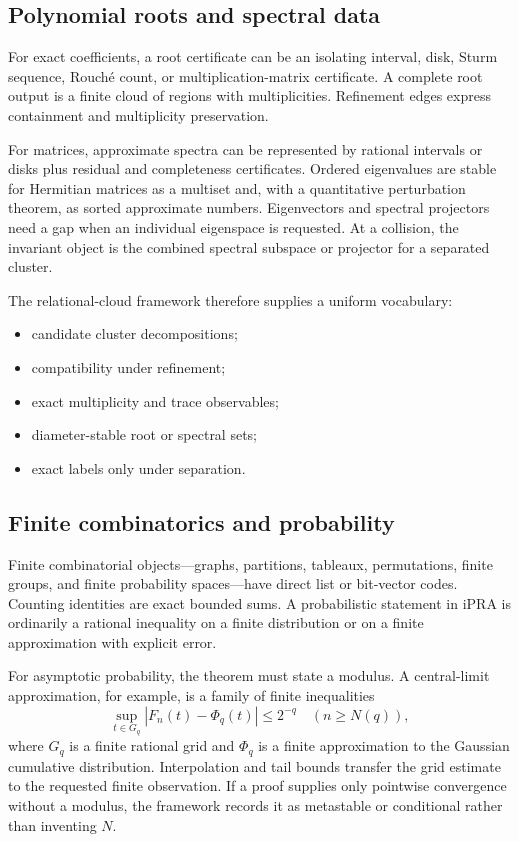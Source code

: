 \subsection{Polynomial roots and spectral data}

For exact coefficients, a root certificate can be an isolating interval, disk, Sturm sequence, Rouch\'e
count, or multiplication-matrix certificate.  A complete root output is a finite cloud of regions with
multiplicities.  Refinement edges express containment and multiplicity preservation.

For matrices, approximate spectra can be represented by rational intervals or disks plus residual and
completeness certificates.  Ordered eigenvalues are stable for Hermitian matrices as a multiset and, with a
quantitative perturbation theorem, as sorted approximate numbers.  Eigenvectors and spectral projectors
need a gap when an individual eigenspace is requested.  At a collision, the invariant object is the combined
spectral subspace or projector for a separated cluster.

The relational-cloud framework therefore supplies a uniform vocabulary:
\begin{itemize}
  \item candidate cluster decompositions;
  \item compatibility under refinement;
  \item exact multiplicity and trace observables;
  \item diameter-stable root or spectral sets;
  \item exact labels only under separation.
\end{itemize}

\subsection{Finite combinatorics and probability}

Finite combinatorial objects---graphs, partitions, tableaux, permutations, finite groups, and finite
probability spaces---have direct list or bit-vector codes.  Counting identities are exact bounded sums.
A probabilistic statement in iPRA is ordinarily a rational inequality on a finite distribution or on a
finite approximation with explicit error.

For asymptotic probability, the theorem must state a modulus.  A central-limit approximation, for example,
is a family of finite inequalities
\[
 \sup_{t\in G_q}
 |F_n(t)-\Phi_q(t)|\le 2^{-q}
 \quad(n\ge N(q)),
\]
where \(G_q\) is a finite rational grid and \(\Phi_q\) is a finite approximation to the Gaussian
cumulative distribution.  Interpolation and tail bounds transfer the grid estimate to the requested finite
observation.  If a proof supplies only pointwise convergence without a modulus, the framework records it as
metastable or conditional rather than inventing \(N\).

